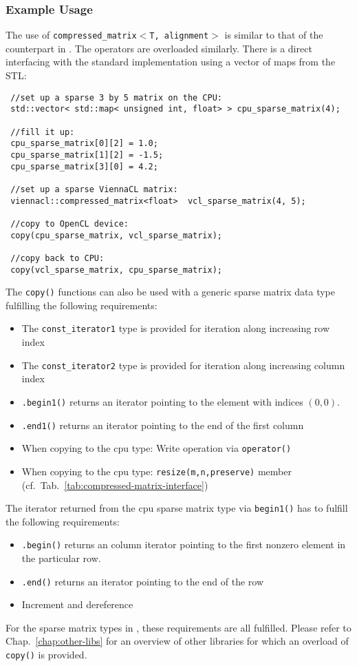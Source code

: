 \subsubsection{Example Usage} \label{sec:compressed-matrix-example}
The use of \texttt{compressed\_matrix$<$T, alignment$>$} is similar to that of the counterpart in {\ublas}. The operators are overloaded similarly.
There is a direct interfacing with the standard implementation using a vector of maps from the STL:
\begin{lstlisting}
 //set up a sparse 3 by 5 matrix on the CPU:
 std::vector< std::map< unsigned int, float> > cpu_sparse_matrix(4);

 //fill it up:
 cpu_sparse_matrix[0][2] = 1.0;
 cpu_sparse_matrix[1][2] = -1.5;
 cpu_sparse_matrix[3][0] = 4.2;

 //set up a sparse ViennaCL matrix:
 viennacl::compressed_matrix<float>  vcl_sparse_matrix(4, 5);

 //copy to OpenCL device:
 copy(cpu_sparse_matrix, vcl_sparse_matrix);

 //copy back to CPU:
 copy(vcl_sparse_matrix, cpu_sparse_matrix);
\end{lstlisting}
The \texttt{copy()} functions can also be used with a generic sparse matrix data type fulfilling the following requirements:
\begin{itemize}
 \item The \texttt{const\_iterator1} type is provided for iteration along increasing row index
 \item The \texttt{const\_iterator2} type is provided for iteration along increasing column index
 \item \texttt{.begin1()} returns an iterator pointing to the element with indices $(0,0)$.
 \item \texttt{.end1()} returns an iterator pointing to the end of the first column
 \item When copying to the cpu type: Write operation via \texttt{operator()}
 \item When copying to the cpu type: \texttt{resize(m,n,preserve)} member (cf.~Tab.~\ref{tab:compressed-matrix-interface})
\end{itemize}
The iterator returned from the cpu sparse matrix type via \texttt{begin1()} has to fulfill the following requirements:
\begin{itemize}
 \item \texttt{.begin()} returns an column iterator pointing to the first nonzero element in the particular row.
 \item \texttt{.end()} returns an iterator pointing to the end of the row
 \item Increment and dereference
\end{itemize}
For the sparse matrix types in {\ublas}, these requirements are all fulfilled. Please refer to Chap.~\ref{chap:other-libs} for an overview
of other libraries for which an overload of \texttt{copy()} is provided.

